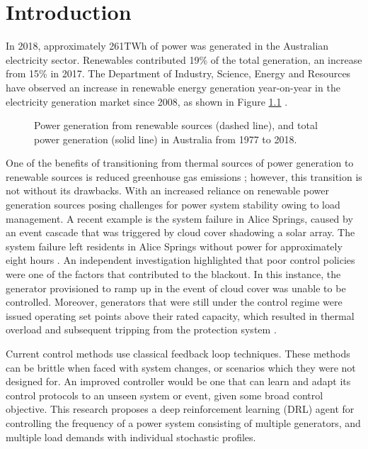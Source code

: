 \chapter{Introduction}
In 2018, approximately 261$\si{\tera\watt\hour}$ of power was generated in the Australian electricity sector. Renewables contributed 19\% of the total generation, an increase from 15\% in 2017. The Department of Industry, Science, Energy and Resources have observed an increase in renewable energy generation year-on-year in the electricity generation market since 2008, as shown in Figure \ref{fig:101_renewable_energy} \cite{Diser2020}.\\

\begin{figure}[ht]
	\centering
	
	\caption[Renewable power generation over time]{Power generation from renewable sources (dashed line), and total power generation (solid line) in Australia from 1977 to 2018.}
	\label{fig:101_renewable_energy}
\end{figure}

One of the benefits of transitioning from thermal sources of power generation to renewable sources is reduced greenhouse gas emissions \cite{IPCC2012}; however, this transition is not without its drawbacks. With an increased reliance on renewable power generation sources posing challenges for power system stability owing to load management. A recent example is the system failure in Alice Springs, caused by an event cascade that was triggered by cloud cover shadowing a solar array. The system failure left residents in Alice Springs without power for approximately eight hours \cite{UCNT2019}. An independent investigation highlighted that poor control policies were one of the factors that contributed to the blackout. In this instance, the generator provisioned to ramp up in the event of cloud cover was unable to be controlled. Moreover, generators that were still under the control regime were issued operating set points above their rated capacity, which resulted in thermal overload and subsequent tripping from the protection system \cite{Wilkey2019}.

Current control methods use classical feedback loop techniques. These methods can be brittle when faced with system changes, or scenarios which they were not designed for. An improved controller would be one that can learn and adapt its control protocols to an unseen system or event, given some broad control objective. This research proposes a deep reinforcement learning (DRL) agent for controlling the frequency of a power system consisting of multiple generators, and multiple load demands with individual stochastic profiles.

